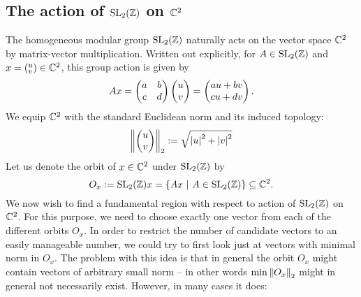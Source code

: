 \subsection{The action of $\operatorname{SL}_{2}(\mathbb{Z})$ on $\mathbb{C}^2$}

The homogeneous modular group $\operatorname{SL}_{2}(\mathbb{Z})$ naturally acts on the vector space $\mathbb{C}^2$ by matrix-vector multiplication. Written out explicitly, for $A \in \operatorname{SL}_{2}(\mathbb{Z})$ and $x = ({}^u_v) \in \mathbb{C}^2$, this group action is given by
\begin{equation*}
A x = \begin{pmatrix}a & b \\ c & d\end{pmatrix} \begin{pmatrix}u \\ v\end{pmatrix} = \begin{pmatrix}a u + b v \\ c u + d v\end{pmatrix}.
\end{equation*}
We equip $\mathbb{C}^2$ with the standard Euclidean norm and its induced topology:
\begin{equation*}
\left\| \begin{pmatrix}u \\ v\end{pmatrix} \right\|_2 := \sqrt{\left|u\right|^2 + \left|v\right|^2}
\end{equation*}
Let us denote the orbit of $x \in \mathbb{C}^2$ under $\operatorname{SL}_{2}(\mathbb{Z})$ by 
\begin{equation}
O_x := \operatorname{SL}_{2}(\mathbb{Z}) x = \{ Ax \ | \ A \in \operatorname{SL}_{2}(\mathbb{Z}) \} \subseteq \mathbb{C}^2.
\end{equation}
We now wish to find a fundamental region with respect to action of $\operatorname{SL}_{2}(\mathbb{Z})$ on $\mathbb{C}^2$. For this purpose, we need to choose exactly one vector from each of the different orbits $O_x$. In order to restrict the number of candidate vectors to an easily manageable number, we could try to first look just at vectors with minimal norm in $O_x$. The problem with this idea is that in general the orbit $O_x$ might contain vectors of arbitrary small norm -- in other words $\min{\left\| O_x \right\|_2}$ might in general not necessarily exist. However, in many cases it does:

